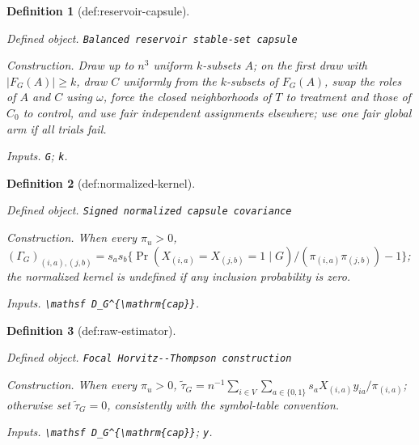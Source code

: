 \documentclass{article}
\newtheorem{definition}{Definition}
\begin{document}
\begin{definition}[def:reservoir-capsule]\label{def:reservoir-capsule}
\par\smallskip\noindent\emph{Defined object.} \texttt{Balanced reservoir stable-\allowbreak{}set capsule}
\par\smallskip\noindent\emph{Construction.} Draw up to \(n^3\) uniform \(k\)-subsets \(A\); on the first draw with \(|F_G(A)|\ge k\), draw \(C\) uniformly from the \(k\)-subsets of \(F_G(A)\), swap the roles of \(A\) and \(C\) using \(\omega\), force the closed neighborhoods of \(T\) to treatment and those of \(C_0\) to control, and use fair independent assignments elsewhere; use one fair global arm if all trials fail.
\par\smallskip\noindent\emph{Inputs.} \texttt{G}; \texttt{k}.
\end{definition}

\begin{definition}[def:normalized-kernel]\label{def:normalized-kernel}
\par\smallskip\noindent\emph{Defined object.} \texttt{Signed normalized capsule covariance}
\par\smallskip\noindent\emph{Construction.} When every \(\pi_u>0\), \((\Gamma_G)_{(i,a),(j,b)}=s_as_b\{\Pr(X_{(i,a)}=X_{(j,b)}=1\mid G)/(\pi_{(i,a)}\pi_{(j,b)})-1\}\); the normalized kernel is undefined if any inclusion probability is zero.
\par\smallskip\noindent\emph{Inputs.} \texttt{\textbackslash{}\allowbreak{}mathsf D\_\allowbreak{}G\textasciicircum{}\{\textbackslash{}\allowbreak{}mathrm\{cap\}\allowbreak{}\}\allowbreak{}}.
\end{definition}

\begin{definition}[def:raw-estimator]\label{def:raw-estimator}
\par\smallskip\noindent\emph{Defined object.} \texttt{Focal Horvitz-\allowbreak{}-\allowbreak{}Thompson construction}
\par\smallskip\noindent\emph{Construction.} When every \(\pi_u>0\), \(\widetilde\tau_G=n^{-1}\sum_{i\in V}\sum_{a\in\{0,1\}}s_aX_{(i,a)}y_{ia}/\pi_{(i,a)}\); otherwise set \(\widetilde\tau_G=0\), consistently with the symbol-table convention.
\par\smallskip\noindent\emph{Inputs.} \texttt{\textbackslash{}\allowbreak{}mathsf D\_\allowbreak{}G\textasciicircum{}\{\textbackslash{}\allowbreak{}mathrm\{cap\}\allowbreak{}\}\allowbreak{}}; \texttt{y}.
\end{definition}
\end{document}
